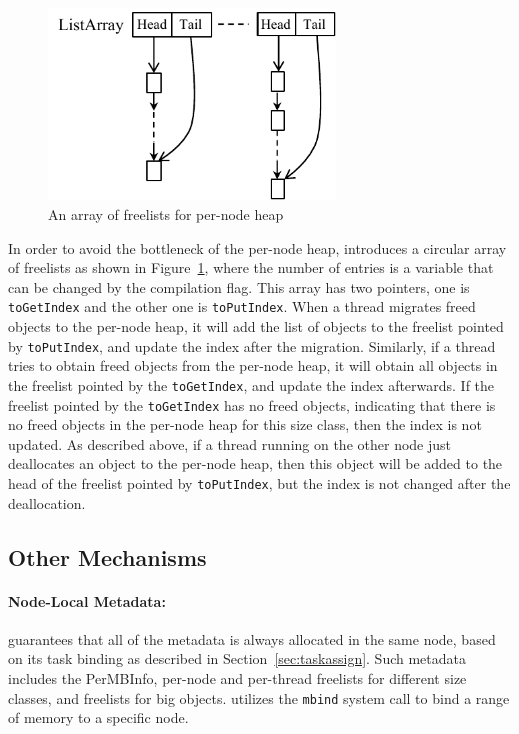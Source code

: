 \begin{figure}
\centering
\includegraphics[width=3in]{figure/listarray}
\vspace{-0.1in}
\caption{An array of freelists for per-node heap\label{fig:listarray}}
\vspace{-0.1in}
\end{figure}
In order to avoid the bottleneck of the per-node heap, \NM{} introduces a circular array of freelists as shown in Figure~\ref{fig:listarray}, where the number of entries is a variable that can be changed by the compilation flag. This array has two pointers, one is \texttt{toGetIndex} and the other one is \texttt{toPutIndex}. When a thread migrates freed objects to the per-node heap, it will add the list of objects to the freelist pointed by \texttt{toPutIndex}, and update the index after the migration. Similarly, if a thread tries to obtain freed objects from the per-node heap, it will obtain all objects in the freelist pointed by the \texttt{toGetIndex}, and update the index afterwards. If the freelist pointed by the \texttt{toGetIndex} has no freed objects, indicating that there is no freed objects in the per-node heap for this size class, then the index is not updated. As described above, if a thread running on the other node just deallocates an object to the per-node heap, then this object will be added to the head of the freelist pointed by  \texttt{toPutIndex}, but the index is not changed after the deallocation.  
 

\subsection{Other Mechanisms}

\paragraph{Node-Local Metadata:} \NM{} guarantees that all of the metadata is always allocated in the same node, based on its task binding as described in Section~\ref{sec:taskassign}. Such metadata includes the PerMBInfo, per-node and per-thread freelists for different size classes, and freelists for big objects. \NM{} utilizes the \texttt{mbind} system call to bind a range of memory to a specific node.  

